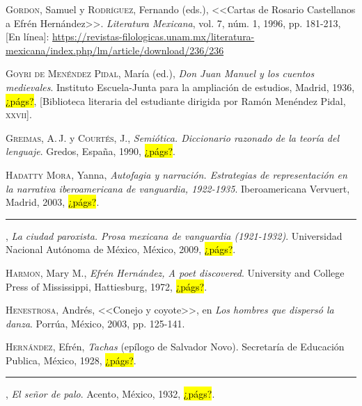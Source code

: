 \documentclass[14pt,twoside,final]{extbook} %
\begin{document}
\textsc{Gordon}, Samuel y \textsc{Rodríguez}, Fernando (eds.), <<Cartas de Rosario Castellanos a Efrén Hernández>>. \emph{Literatura Mexicana}, vol. 7, núm. 1, 1996, pp. 181-213, [En línea]: \href{https://revistas-filologicas.unam.mx/literatura-mexicana/index.php/lm/article/download/236/236}{https://revistas-filologicas.unam.mx/literatura-mexicana/index.php/lm/article/download/236/236}\label{bib:gordon-rodriguez1996} 

\textsc{Goyri de Menéndez Pidal}, María (ed.), \emph{Don Juan Manuel y los cuentos medievales}. Instituto Escuela-Junta para la ampliación de estudios, Madrid, 1936, \hl{¿págs?}, [Biblioteca literaria del estudiante dirigida por Ramón Menéndez Pidal, \textsc{xxvii}].\label{bib:goyri1936}

\textsc{Greimas}, A.\,J. y \textsc{Courtés}, J., \emph{Semiótica. Diccionario razonado de la teoría del lenguaje}. Gredos, España, 1990, \hl{¿págs?}.\label{bib:greimas1990}

\textsc{Hadatty Mora}, Yanna, \emph{Autofagia y narración. Estrategias de representación en la narrativa iberoamericana de vanguardia, 1922-1935}. Iberoamericana Vervuert, Madrid, 2003, \hl{¿págs?}.\label{bib:hadatty2003}

\rule{1cm}{0.4pt}, \emph{La ciudad paroxista. Prosa mexicana de vanguardia (1921-1932)}. Universidad Nacional Autónoma de México, México, 2009, \hl{¿págs?}.\label{bib:hadatty2009}

\textsc{Harmon}, Mary M., \emph{Efrén Hernández, A poet discovered}. University and College Press of Mississippi, Hattiesburg, 1972, \hl{¿págs?}.\label{bib:harmon1972}

\textsc{Henestrosa}, Andrés, <<Conejo y coyote>>, en \emph{Los hombres que dispersó la danza}. Porrúa, México, 2003, pp. 125-141.\label{bib:henestroza2003}

\textsc{Hernández}, Efrén, \emph{Tachas} (epílogo de Salvador Novo). Secretaría de Educación Publica, México, 1928, \hl{¿págs?}.\label{bib:hernandez1928}

\rule{1cm}{0.4pt}, \emph{El señor de palo}. Acento, México, 1932, \hl{¿págs?}.\label{bib:hernandez1932}
\end{document}
